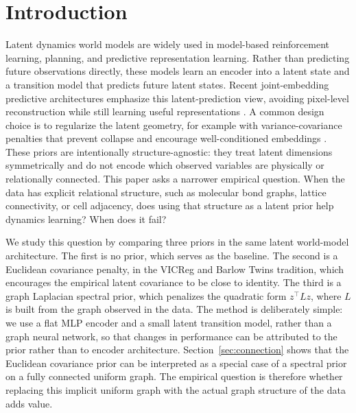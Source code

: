 \section{Introduction}\label{sec:intro}

Latent dynamics world models are widely used in model-based reinforcement learning, planning, and predictive representation learning. Rather than predicting future observations directly, these models learn an encoder into a latent state and a transition model that predicts future latent states. Recent joint-embedding predictive architectures emphasize this latent-prediction view, avoiding pixel-level reconstruction while still learning useful representations \cite{ijepa,lejepa}. A common design choice is to regularize the latent geometry, for example with variance-covariance penalties that prevent collapse and encourage well-conditioned embeddings \cite{vicreg,barlowtwins}. These priors are intentionally structure-agnostic: they treat latent dimensions symmetrically and do not encode which observed variables are physically or relationally connected. This paper asks a narrower empirical question. When the data has explicit relational structure, such as molecular bond graphs, lattice connectivity, or cell adjacency, does using that structure as a latent prior help dynamics learning? When does it fail?

We study this question by comparing three priors in the same latent world-model architecture. The first is no prior, which serves as the baseline. The second is a Euclidean covariance penalty, in the VICReg and Barlow Twins tradition, which encourages the empirical latent covariance to be close to identity. The third is a graph Laplacian spectral prior, which penalizes the quadratic form \(z^\top L z\), where \(L\) is built from the graph observed in the data. The method is deliberately simple: we use a flat MLP encoder and a small latent transition model, rather than a graph neural network, so that changes in performance can be attributed to the prior rather than to encoder architecture. Section~\ref{sec:connection} shows that the Euclidean covariance prior can be interpreted as a special case of a spectral prior on a fully connected uniform graph. The empirical question is therefore whether replacing this implicit uniform graph with the actual graph structure of the data adds value.

